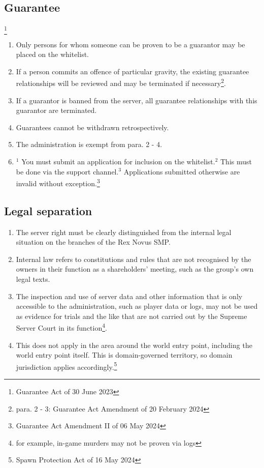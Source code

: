 \documentclass{article}
\begin{document}
\subsection{Guarantee}\footnote{Guarantee Act of 30 June 2023}
\begin{enumerate}[(1)]
	\item Only persons for whom someone can be proven to be a guarantor may be placed on the whitelist.
	\item If a person commits an offence of particular gravity, the existing guarantee relationships will be reviewed and may be terminated if necessary\footnote{para. 2 - 3: Guarantee Act Amendment of 20 February 2024}.
	\item If a guarantor is banned from the server, all guarantee relationships with this guarantor are terminated.
	\item Guarantees cannot be withdrawn retrospectively.
	\item The administration is exempt from para. 2 - 4.
	\item $^{1}$ You must submit an application for inclusion on the whitelist.$^{2}$ This must be done via the support channel.$^{3}$ Applications submitted otherwise are invalid without exception.\footnote{Guarantee Act Amendment II of 06 May 2024}
\end{enumerate}

\subsection{Legal separation}
\begin{enumerate}[(1)]
	\item The server right must be clearly distinguished from the internal legal situation on the branches of the Rex Novus SMP.
	\item Internal law refers to constitutions and rules that are not recognised by the owners in their function as a shareholders' meeting, such as the group's own legal texts.
	\item The inspection and use of server data and other information that is only accessible to the administration, such as player data or logs, may not be used as evidence for trials and the like that are not carried out by the Supreme Server Court in its function\footnote{for example, in-game murders may not be proven via logs}.
	\item This does not apply in the area around the world entry point, including the world entry point itself. This is domain-governed territory, so domain jurisdiction applies accordingly.\footnote{Spawn Protection Act of 16 May 2024}
\end{enumerate}
\end{document}
